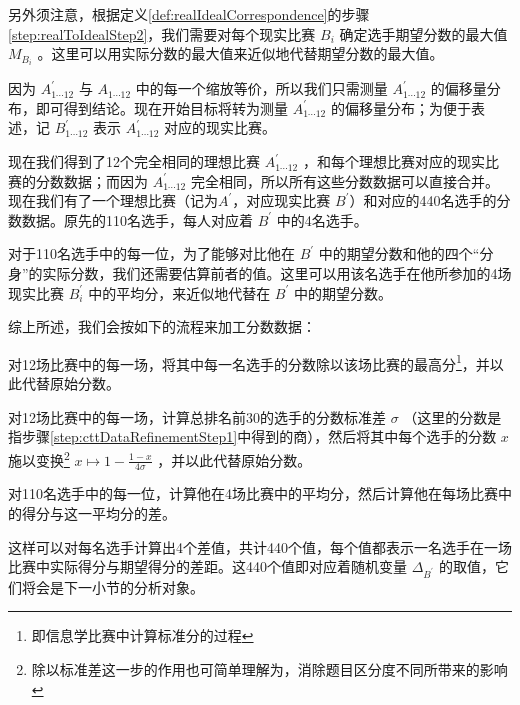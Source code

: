         \vspace{1.5ex}

        另外须注意，根据定义\ref{def:realIdealCorrespondence}的步骤\ref{step:realToIdealStep2}，我们需要对每个现实比赛 $B_i$ 确定选手期望分数的最大值 $M_{B_i}$ 。这里可以用实际分数的最大值来近似地代替期望分数的最大值。
        
        因为 $A^{\prime}_{1\cdots 12}$ 与 $A_{1\cdots 12}$ 中的每一个缩放等价，所以我们只需测量 $A^{\prime}_{1\cdots 12}$ 的偏移量分布，即可得到结论。现在开始目标将转为测量 $A^{\prime}_{1\cdots 12}$ 的偏移量分布；为便于表述，记 $B^{\prime}_{1\cdots 12}$ 表示 $A^{\prime}_{1\cdots 12}$ 对应的现实比赛。

        现在我们得到了12个完全相同的理想比赛 $A^{\prime}_{1\cdots 12}$ ，和每个理想比赛对应的现实比赛的分数数据；而因为 $A^{\prime}_{1\cdots 12}$ 完全相同，所以所有这些分数数据可以直接合并。现在我们有了一个理想比赛（记为$A^{\prime}$，对应现实比赛 $B^{\prime}$）和对应的440名选手的分数数据。原先的110名选手，每人对应着 $B^{\prime}$ 中的4名选手。

        对于110名选手中的每一位，为了能够对比他在 $B^{\prime}$ 中的期望分数和他的四个“分身”的实际分数，我们还需要估算前者的值。这里可以用该名选手在他所参加的4场现实比赛 $B^{\prime}_i$ 中的平均分，来近似地代替在 $B^{\prime}$ 中的期望分数。

        \vspace{1.5ex}

        综上所述，我们会按如下的流程来加工分数数据：
        \begin{asparaenum}[\bfseries{步骤} 1.]
            \item \label{step:cttDataRefinementStep1} 对12场比赛中的每一场，将其中每一名选手的分数除以该场比赛的最高分\footnote{即信息学比赛中计算标准分的过程}，并以此代替原始分数。
            \item 对12场比赛中的每一场，计算总排名前30的选手的分数标准差 $\sigma$ （这里的分数是指步骤\ref{step:cttDataRefinementStep1}中得到的商），然后将其中每个选手的分数 $x$ 施以变换\footnote{除以标准差这一步的作用也可简单理解为，消除题目区分度不同所带来的影响} $x\mapsto 1-\frac{1-x}{4\sigma}$ ，并以此代替原始分数。
            \item 对110名选手中的每一位，计算他在4场比赛中的平均分，然后计算他在每场比赛中的得分与这一平均分的差。
        \end{asparaenum}

        \vspace{1.5ex}

        这样可以对每名选手计算出4个差值，共计440个值，每个值都表示一名选手在一场比赛中实际得分与期望得分的差距。这440个值即对应着随机变量 $\Delta_{B^{\prime}}$ 的取值，它们将会是下一小节的分析对象。

